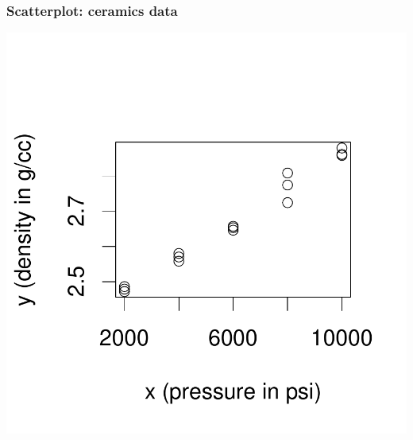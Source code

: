 \documentclass[handout]{beamer}
\numberwithin{equation}{section}
\begin{document}
\begin{frame}
\frametitle{\small Scatterplot: ceramics data}

\begin{center}
\includegraphics{ch4part1-003}
\end{center}
\end{frame}
\end{document}
